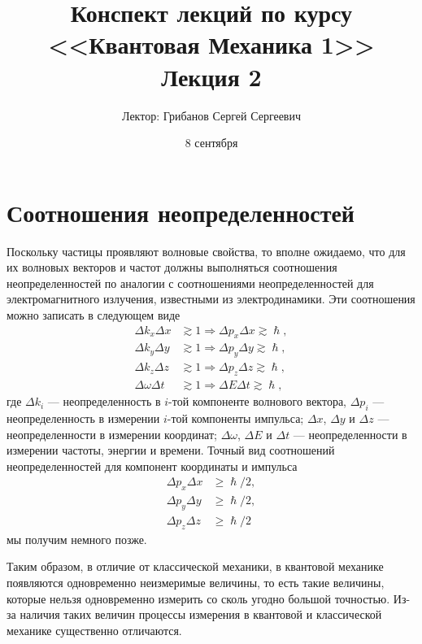 \documentclass[a4paper, 12pt]{article}
\title{Конспект лекций по курсу <<Квантовая Механика 1>>  \\ \large Лекция 2}
\author{Лектор: Грибанов Сергей Сергеевич}
\date{8 сентября}
\begin{document}
\maketitle

\tableofcontents

\section{Соотношения неопределенностей}
Поскольку частицы проявляют волновые свойства, то вполне ожидаемо, что для их волновых векторов и частот должны выполняться соотношения неопределенностей по аналогии с соотношениями неопределенностей для электромагнитного излучения, известными из электродинамики. Эти соотношения можно записать в следующем виде
\begin{equation}
  \begin{split}
    \Delta{k}_x\Delta{x} &\gtrsim 1 \Rightarrow \Delta{p}_x\Delta{x} \gtrsim \hslash,\\
    \Delta{k}_y\Delta{y} &\gtrsim 1 \Rightarrow \Delta{p}_y\Delta{y} \gtrsim \hslash,\\
    \Delta{k}_z\Delta{z} &\gtrsim 1 \Rightarrow \Delta{p}_z\Delta{z} \gtrsim \hslash,\\
    \Delta{\omega}\Delta{t} &\gtrsim 1 \Rightarrow \Delta{E}\Delta{t} \gtrsim \hslash,
  \end{split}
\end{equation}
где $\Delta{k}_i$ --- неопределенность в $i$-той компоненте волнового вектора, $\Delta{p}_i$ --- неопределенность в измерении $i$-той компоненты импульса; $\Delta{x}$, $\Delta{y}$ и $\Delta{z}$ --- неопределенности в измерении координат; $\Delta\omega$, $\Delta{E}$ и $\Delta{t}$ --- неопределенности в измерении частоты, энергии и времени. Точный вид соотношений неопределенностей для компонент координаты и импульса
\begin{equation}
  \begin{split}
    \Delta{p}_x\Delta{x} &\geq \hslash / 2,\\
    \Delta{p}_y\Delta{y} &\geq \hslash / 2,\\
    \Delta{p}_z\Delta{z} &\geq \hslash / 2
  \end{split}
\end{equation}
мы получим немного позже.

Таким образом, в отличие от классической механики, в квантовой механике появляются одновременно неизмеримые величины, то есть такие величины, которые нельзя одновременно измерить со сколь угодно большой точностью. Из-за наличия таких величин процессы измерения в квантовой и классической механике существенно отличаются.
\end{document}
